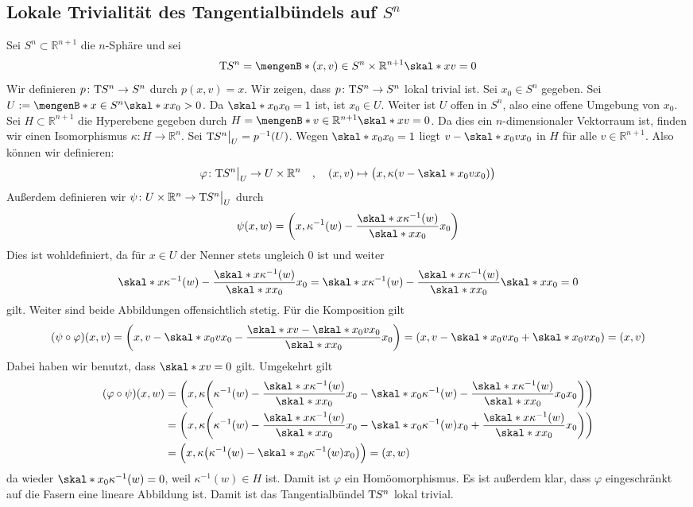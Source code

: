 \subsection{Lokale Trivialität des Tangentialbündels auf $S^n$} %
\label{sub:lokal_trivial_Sn}
Sei $S^n \subset \mathds{R}^{n+1}$ die $n$-Sphäre und sei 
\[
	\Tmap S^n = \set[(x,v) \in S^n \times \mathds{R}^{n+1}]{\skal*{x}{v}=0} 
\]
Wir definieren $p \colon \mathrm{T}\mkern-0.85mu S^n \to S^n$ durch $p(x,v)=x$. Wir zeigen, dass $p \colon \mathrm{T}\mkern-0.85mu S^n \to S^n$ lokal trivial ist.
Sei $x_0 \in S^n$ gegeben. Sei $U := \set[x \in S^n]{\skal*{x}{x_0}>0}$. Da $\skal*{x_0}{x_0}=1$ ist, ist $x_0 \in U$. Weiter ist $U$ offen in $S^n$, also eine offene 
Umgebung von $x_0$. Sei $H \subset \mathds{R}^{n+1}$ die Hyperebene gegeben durch $H = \set[v \in \mathds{R}^{n+1}]{\skal*{x}{v}=0}$. Da dies ein $n$-dimensionaler 
Vektorraum ist, finden wir einen Isomorphismus $\kappa \colon H \to \mathds{R}^n$. Sei $\mathrm{T}\mkern-0.85mu S^n \big|_U=p^{-1}(U)$. Wegen $\skal*{x_0}{x_0}=1$ liegt $v- \skal*{x_0}{v} x_0$
in $H$ für alle $v \in \mathds{R}^{n+1}$. Also können wir definieren:
\[
	\varphi \colon \Tmap S^n\big|_{U} \to U \times \mathds{R}^n \quad , \quad (x,v) \mapsto \enbrace[\big]{x, \kappa(v - \skal*{x_0}{v} x_0)} 
\]
Außerdem definieren wir $\psi \colon U \times \mathbb{R}^n \to \mathrm{T}\mkern-0.85mu S^n \big|_U$ durch
\[
	\psi(x,w) = \enbrace*{x , \kappa^{-1}(w) - \frac{\skal*{x}{\kappa^{-1}(w)}}{\skal*{x}{x_0}} x_0 } 
\]
Dies ist wohldefiniert, da für $x \in U$ der Nenner stets ungleich $0$ ist und weiter
\[
	\skal*{x}{\kappa^{-1}(w) - \frac{\skal*{x}{\kappa ^{-1}(w)}}{\skal*{x}{x_0}} x_0} = \skal*{x}{\kappa^{-1}(w)} - \frac{\skal*{x}{\kappa ^{-1}(w)}}{\skal*{x}{x_0}} 
	\skal*{x}{x_0} = 0
\]
gilt. Weiter sind beide Abbildungen offensichtlich stetig. Für die Komposition gilt
\begin{align*}
	(\psi \circ \varphi)(x,v) = \enbrace*{x, v - \skal*{x_0}{v} x_0 - \frac{\skal*{x}{v- \skal*{x_0}{v} x_0}}{\skal*{x}{x_0}}x_0 }
	= \enbrace*{x, v - \skal*{x_0}{v} x_0 + \skal*{x_0}{v}x_0} = (x,v)  
\end{align*}
Dabei haben wir benutzt, dass $\skal*{x}{v}=0$ gilt. Umgekehrt gilt
\begin{align*}
	(\varphi \circ \psi)(x,w) &= \enbrace*{x , \kappa \enbrace*{\kappa^{-1}(w) - \frac{\skal*{x}{\kappa^{-1}(w)}}{\skal*{x}{x_0}}x_0 - \skal*{x_0}{\kappa^{-1}(w) - 
	\frac{\skal*{x}{\kappa^{-1}(w)}}{\skal*{x}{x_0}}x_0} x_0 } } \\
	&= \enbrace*{x , \kappa \enbrace*{\kappa^{-1}(w) - \frac{\skal*{x}{\kappa^{-1}(w)}}{\skal*{x}{x_0}}x_0 - 
	\skal*{x_0}{\kappa^{-1}(w)} x_0 + \frac{\skal*{x}{\kappa^{-1}(w)}}{\skal*{x}{x_0}} x_0 }}\\
	&= \enbrace[\Big]{x , \kappa \enbrace*{\kappa^{-1}(w) - \skal*{x_0}{\kappa^{-1}(w)} x_0} } = (x,w)
\end{align*}
da wieder $\skal*{x_0}{\kappa ^{-1}(w)}=0$, weil $\kappa ^{-1}(w) \in H$ ist. Damit ist $\varphi$ ein Homöomorphismus. Es ist außerdem klar, dass $\varphi$ eingeschränkt auf 
die Fasern eine lineare Abbildung ist. Damit ist das Tangentialbündel $\mathrm{T}\mkern-0.85mu S^n$ lokal trivial. \bewende








\cleardoubleoddemptypage
{}
\setcounter{page}{1}

\printindex
\listoffigures
\todototoc
{}
